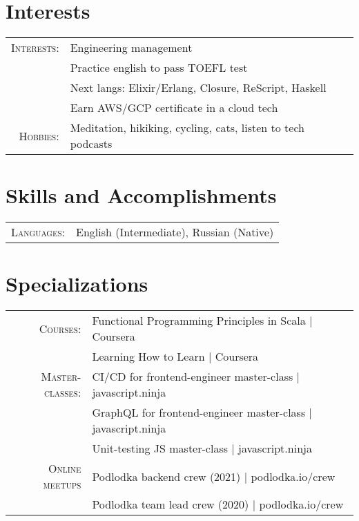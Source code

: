 \documentclass[a4paper,11pt]{article}
\begin{document}
\section{Interests}
\begin{tabular}{rl}
  \textsc{Interests:}
    &Engineering management\\
    &Practice english to pass TOEFL test\\
    &Next langs: Elixir/Erlang, Closure, ReScript, Haskell\\
    &Earn AWS/GCP certificate in a cloud tech\\
  \textsc{Hobbies:}
    &Meditation, hikiking, cycling, cats, listen to tech podcasts\\
\end{tabular}

\section{Skills and Accomplishments}
\begin{tabular}{rl}
  \textsc{Languages:}& English (Intermediate), Russian (Native)\\
\end{tabular}

\section{Specializations}
\begin{tabular}{rl}
  \textsc{Courses:}
  &Functional Programming Principles in Scala | Coursera\\
  &Learning How to Learn | Coursera\\
  \textsc{Master-classes:}
  &CI/CD for frontend-engineer master-class | javascript.ninja \\
  &GraphQL for frontend-engineer master-class | javascript.ninja \\
  &Unit-testing JS master-class | javascript.ninja \\
  \textsc{Online meetups}
  &Podlodka backend crew (2021) | podlodka.io/crew \\
  &Podlodka team lead crew (2020) | podlodka.io/crew \\
\end{tabular}
\end{document}
